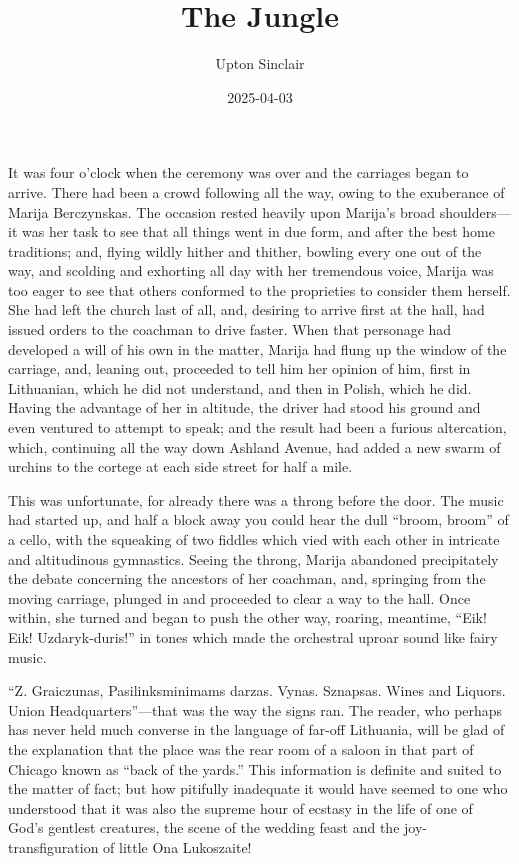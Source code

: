 \documentclass[
]{article}
\title{The Jungle}
\author{Upton Sinclair}
\date{2025-04-03}
\begin{document}
\maketitle

{
\setcounter{tocdepth}{2}
\tableofcontents
}
\section{}\label{section}

It was four o'clock when the ceremony was over and the carriages began to arrive. There had been a crowd following all the way, owing to the exuberance of Marija Berczynskas. The occasion rested heavily upon Marija's broad shoulders---it was her task to see that all things went in due form, and after the best home traditions; and, flying wildly hither and thither, bowling every one out of the way, and scolding and exhorting all day with her tremendous voice, Marija was too eager to see that others conformed to the proprieties to consider them herself. She had left the church last of all, and, desiring to arrive first at the hall, had issued orders to the coachman to drive faster. When that personage had developed a will of his own in the matter, Marija had flung up the window of the carriage, and, leaning out, proceeded to tell him her opinion of him, first in Lithuanian, which he did not understand, and then in Polish, which he did. Having the advantage of her in altitude, the driver had stood his ground and even ventured to attempt to speak; and the result had been a furious altercation, which, continuing all the way down Ashland Avenue, had added a new swarm of urchins to the cortege at each side street for half a mile.

This was unfortunate, for already there was a throng before the door. The music had started up, and half a block away you could hear the dull ``broom, broom'' of a cello, with the squeaking of two fiddles which vied with each other in intricate and altitudinous gymnastics. Seeing the throng, Marija abandoned precipitately the debate concerning the ancestors of her coachman, and, springing from the moving carriage, plunged in and proceeded to clear a way to the hall. Once within, she turned and began to push the other way, roaring, meantime, ``Eik! Eik! Uzdaryk-duris!'' in tones which made the orchestral uproar sound like fairy music.

``Z. Graiczunas, Pasilinksminimams darzas. Vynas. Sznapsas. Wines and Liquors. Union Headquarters''---that was the way the signs ran. The reader, who perhaps has never held much converse in the language of far-off Lithuania, will be glad of the explanation that the place was the rear room of a saloon in that part of Chicago known as ``back of the yards.'' This information is definite and suited to the matter of fact; but how pitifully inadequate it would have seemed to one who understood that it was also the supreme hour of ecstasy in the life of one of God's gentlest creatures, the scene of the wedding feast and the joy-transfiguration of little Ona Lukoszaite!
\end{document}
